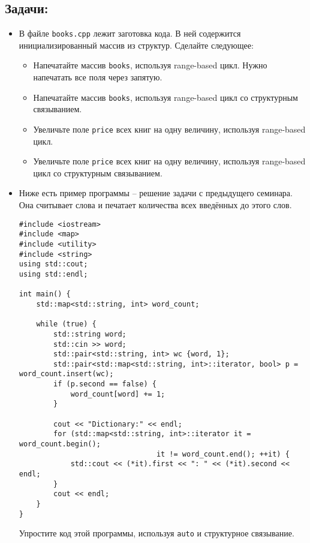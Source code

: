 \documentclass{article}
\begin{document}
\subsection*{Задачи:}
\begin{itemize}
\item В файле \texttt{books.cpp} лежит заготовка кода. В ней содержится инициализированный массив из структур. Сделайте следующее:
\begin{itemize}
\item Напечатайте массив \texttt{books}, используя range-based цикл. Нужно напечатать все поля через запятую.
\item Напечатайте массив \texttt{books}, используя range-based цикл со структурным связыванием.
\item Увеличьте поле \texttt{price} всех книг на одну величину, используя range-based цикл.
\item Увеличьте поле \texttt{price} всех книг на одну величину, используя range-based цикл со структурным связыванием.
\end{itemize}
\item Ниже есть пример программы -- решение задачи с предыдущего семинара. Она считывает слова и печатает количества всех введённых до этого слов.
\begin{lstlisting}
#include <iostream>
#include <map>
#include <utility>
#include <string>
using std::cout;
using std::endl;

int main() {
    std::map<std::string, int> word_count;
    
    while (true) {
        std::string word;
        std::cin >> word;
        std::pair<std::string, int> wc {word, 1};
        std::pair<std::map<std::string, int>::iterator, bool> p = word_count.insert(wc);
        if (p.second == false) {
            word_count[word] += 1;
        }
        
        cout << "Dictionary:" << endl;
        for (std::map<std::string, int>::iterator it = word_count.begin(); 
                                it != word_count.end(); ++it) {
            std::cout << (*it).first << ": " << (*it).second << endl;
        }
        cout << endl;
    } 
}
\end{lstlisting}
Упростите код этой программы, используя \texttt{auto} и структурное связывание.
\end{itemize}
\end{document}
